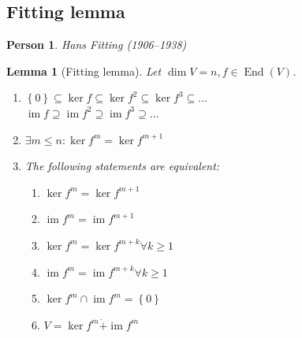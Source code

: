 \documentclass[a4paper]{article}
\newcounter{lecref}[section]
\numberwithin{lecref}{section}
\newtheorem{lemma}[lecref]{Lemma}
\newtheorem*{Person}{Person}
\newcommand{\set}[1]{\left\{#1\right\}}
\DeclareMathOperator{\im}{im}
\begin{document}
\subsection{Fitting lemma}

\begin{Person}
  Hans Fitting (1906--1938)
\end{Person}

\begin{lemma}[Fitting lemma]
  Let $\dim{V} = n, f \in \operatorname{End}(V)$.
  \begin{enumerate}
    \item $\set{0} \subseteq \ker{f} \subseteq \ker{f^2} \subseteq \ker{f^3} \subseteq \dots$ \\
          $\im{f} \supseteq \im{f^2} \supseteq \im{f^3} \supseteq \dots$
    \item $\exists m \leq n: \ker{f^m} = \ker{f^{m+1}}$
    \item The following statements are equivalent:
      \begin{enumerate}
        \item $\ker{f^m} = \ker{f^{m+1}}$
        \item $\im{f^m} = \im{f^{m+1}}$
        \item $\ker{f^m} = \ker{f^{m+k}} \forall k \geq 1$
        \item $\im{f^m} = \im{f^{m+k}} \forall k \geq 1$
        \item $\ker{f^m} \cap \im{f^m} = \set{0}$
        \item $V = \ker{f^m} \dot{+} \im{f^m}$
      \end{enumerate}
  \end{enumerate}
\end{lemma}
\end{document}

